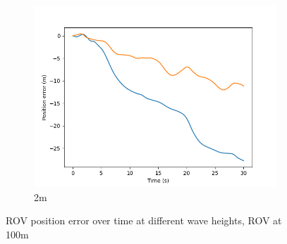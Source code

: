 \documentclass[class=article, crop=false]{standalone}
\begin{document}
\begin{figure}
\begin{subfigure}[b]{0.48\textwidth}
        \includegraphics{scenario1/rov-100m/2.0m/rov_position_error_uncontrolled}
        \caption{2m}
        \label{}
    \end{subfigure}

    \caption{ROV position error over time at different wave heights, ROV at 100m}
\end{figure}
\end{document}
